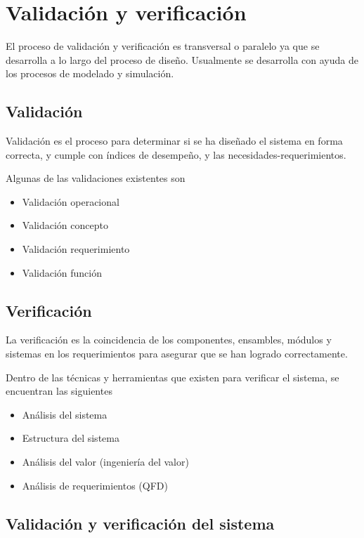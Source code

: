 \section{Validación y verificación}

El proceso de validación y verificación es transversal o paralelo ya que se desarrolla a lo largo del proceso de diseño. Usualmente se desarrolla con ayuda de los procesos de modelado y simulación.

\subsection{Validación}

Validación es el proceso para determinar si se ha diseñado el sistema en forma correcta, y cumple con índices de desempeño, y las necesidades-requerimientos.

Algunas de las validaciones existentes son 
\begin{itemize}
    \item Validación operacional
    \item Validación concepto
    \item Validación requerimiento
    \item Validación función 
\end{itemize}

\subsection{Verificación}

La verificación es la coincidencia de los componentes, ensambles, módulos y sistemas en los requerimientos para asegurar que se han logrado correctamente. 

Dentro de las técnicas y herramientas que existen para verificar el sistema, se encuentran las siguientes

\begin{itemize}
    \item Análisis del sistema
    \item Estructura del sistema
    \item Análisis del valor (ingeniería del valor)
    \item Análisis de requerimientos (QFD)
\end{itemize}

\subsection{Validación y verificación del sistema}

